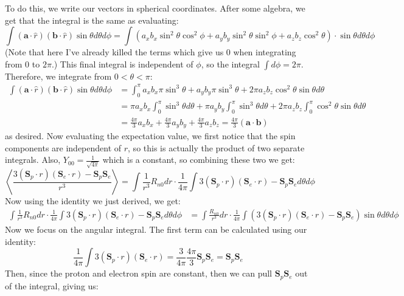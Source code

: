 \documentclass[10pt]{article}
\begin{document}
	\begin{solution}
		To do this, we write our vectors in spherical coordinates. After some algebra, we get that the integral
		is the same as evaluating: 
		\[
		\int (\mathbf a \cdot \hat{r}) (\mathbf b \cdot \hat{r}) \sin \theta d \theta d\phi = \int (a_x b_x
		\sin^2 \theta \cos^2 \phi + a_y b_y \sin^2 \theta \sin^2 \phi + a_z b_z \cos^2 \theta) \cdot \sin \theta
		d \theta d \phi
		\] 
		(Note that here I've already killed the terms which give us 0 when integrating from $0$ to $2\pi$.)
		This final integral is independent of $\phi$, so the integral $\int d\phi = 2\pi$. Therefore, we integrate from $0 < \theta < \pi$: 
		\begin{align*}
			\int (\mathbf a \cdot \hat r)(\mathbf b \cdot \hat r) \sin \theta d\theta d\phi &= \int_0^\pi a_xb_x\pi \sin^3 \theta + a_y b_y \pi \sin^3 \theta + 2\pi a_zb_z \cos^2 \theta \sin 
			\theta d \theta\\
			&= \pi a_x b_x \int_0^\pi \sin^3 \theta d\theta + \pi a_yb_y \int_0^\pi \sin^3 \theta d\theta + 2\pi a_z b_z \int_0^\pi \cos^2 \theta \sin \theta d\theta\\
			&= \frac{4\pi}{3} a_xb_x + \frac{4\pi}{3} a_yb_y + \frac{4\pi}{3}a_zb_z = \frac{4\pi}{3} (\mathbf{a \cdot b})
		\end{align*}
		as desired. Now evaluating the expectation value, we first notice that the spin components are independent of $r$, so this is actually the product of two separate integrals. Also, $Y_{00} = \frac{1}{\sqrt{4\pi}}$ which is a constant, so combining these two we get:
		\[ \left\langle \frac{3(\mathbf S_p \cdot r)(\mathbf S_e \cdot r) - \mathbf S_p \mathbf S_e}{r^3}
		\right\rangle = \int \frac{1}{r^3}R_{n0} dr \cdot \frac{1}{4\pi} \int 3(\mathbf S_p \cdot r) (\mathbf S_e \cdot r) - \mathbf S_p \mathbf S_e d\theta d\phi \]
		Now using the identity we just derived, we get: 
		\begin{align*}
			\int \frac{1}{r^3}R_{n0} dr \cdot \frac{1}{4\pi} \int 3(\mathbf S_p \cdot r) (\mathbf S_e \cdot r) - \mathbf S_p \mathbf S_e d\theta d\phi &= \int \frac{R_{n0}}{r^3} dr \cdot \frac{1}{4\pi} \int \left(3 (\mathbf S_p \cdot r)(\mathbf S_e \cdot r) - \mathbf S_p \mathbf S_e \right)\sin \theta d\theta d\phi
		\end{align*}
		Now we focus on the angular integral. The first term can be calculated using our identity: 
		\[ \frac{1}{4\pi} \int 3(\mathbf S_p \cdot r)(\mathbf S_e \cdot r) = \frac{3}{4\pi} \frac{4\pi}{3} \mathbf S_p \mathbf S_e = \mathbf S_p\mathbf S_e\]
		Then, since the proton and electron spin are constant, then we can pull $\mathbf S_p \mathbf S_e$ out of the integral, giving us: 

\end{solution}
\end{document}

